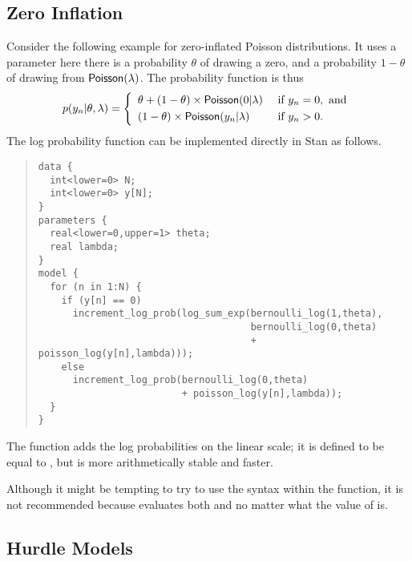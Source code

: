 \subsection{Zero Inflation}

Consider the following example for zero-inflated Poisson
distributions.  It uses a parameter  here there is a
probability $\theta$ of drawing a zero, and a probability $1 - \theta$
of drawing from $\mbox{\sf Poisson}(\lambda)$.  The probability function
is thus
\[
p(y_n|\theta,\lambda) 
= 
\left\{
\begin{array}{ll}
\theta + (1 - \theta) \times \mbox{\sf Poisson}(0|\lambda) & \mbox{ if } y_n = 0, \mbox{ and}
\\[3pt]
(1-\theta) \times \mbox{\sf Poisson}(y_n|\lambda) & \mbox{ if } y_n > 0.
\end{array}
\right.
\] 
%
The log probability function can be implemented directly in Stan as follows.
%
\begin{quote}
\begin{Verbatim}[fontsize=\small]
data {
  int<lower=0> N;
  int<lower=0> y[N];
}
parameters {
  real<lower=0,upper=1> theta;
  real lambda;
}
model {
  for (n in 1:N) {
    if (y[n] == 0)
      increment_log_prob(log_sum_exp(bernoulli_log(1,theta),
                                     bernoulli_log(0,theta) 
                                     + poisson_log(y[n],lambda)));
    else
      increment_log_prob(bernoulli_log(0,theta)
                         + poisson_log(y[n],lambda));
  }
}
\end{Verbatim}
\end{quote}
%
The  function adds the log probabilities
on the linear scale; it is defined to be equal to , but is more arithmetically stable and faster.

Although it might be tempting to try to use the  syntax
within the  function, it is not recommended
because  evaluates both  and
 no matter what the value of  is.

\subsection{Hurdle Models}

